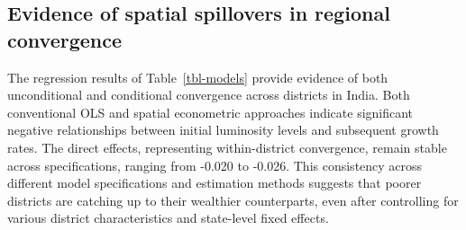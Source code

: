 \documentclass[
  letterpaper,
  DIV=11,
  numbers=noendperiod]{scrartcl}
\begin{document}
\subsection{Evidence of spatial spillovers in regional
convergence}\label{evidence-of-spatial-spillovers-in-regional-convergence}

The regression results of Table~\ref{tbl-models} provide evidence of
both unconditional and conditional convergence across districts in
India. Both conventional OLS and spatial econometric approaches indicate
significant negative relationships between initial luminosity levels and
subsequent growth rates. The direct effects, representing
within-district convergence, remain stable across specifications,
ranging from -0.020 to -0.026. This consistency across different model
specifications and estimation methods suggests that poorer districts are
catching up to their wealthier counterparts, even after controlling for
various district characteristics and state-level fixed effects.
\end{document}
